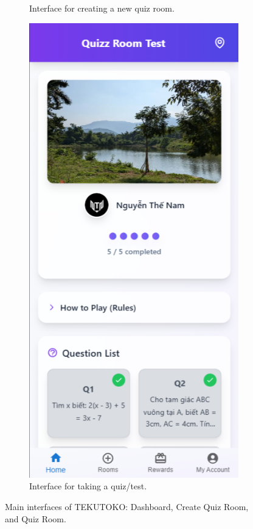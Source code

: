 \begin{figure}[h!]
\begin{subfigure}[b]{0.3\textwidth}
        \caption{Interface for creating a new quiz room.}
        \label{fig:second_image}
    \end{subfigure}
    \hfill
    \begin{subfigure}[b]{0.3\textwidth}
        \centering
        \includegraphics[width=\textwidth]{figures/ui-quizz-room.png}
        \caption{Interface for taking a quiz/test.}
        \label{fig:third_image}
    \end{subfigure}

    \caption{Main interfaces of TEKUTOKO: Dashboard, Create Quiz Room, and Quiz Room.}
    \label{fig:three_images}
\end{figure}
\FloatBarrier

